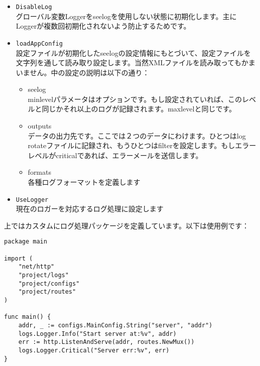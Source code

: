 \begin{itemize}
  \item \texttt{DisableLog}\\ グローバル変数Loggerをseelogを使用しない状態に初期化します。主にLoggerが複数回初期化されないよう防止するためです。
  \item \texttt{loadAppConfig}\\ 設定ファイルが初期化したseelogの設定情報にもとづいて、設定ファイルを文字列を通して読み取り設定します。当然XMLファイルを読み取ってもかまいません。中の設定の説明は以下の通り：
\begin{itemize}
  \item seelog\\ minlevelパラメータはオプションです。もし設定されていれば、このレベルと同じかそれ以上のログが記録されます。maxlevelと同じです。
  \item outputs\\ データの出力先です。ここでは２つのデータにわけます。ひとつはlog rotateファイルに記録され、もうひとつはfilterを設定します。もしエラーレベルがcriticalであれば、エラーメールを送信します。
  \item formats\\ 各種ログフォーマットを定義します
\end{itemize}
  \item \texttt{UseLogger}\\ 現在のロガーを対応するログ処理に設定します
\end{itemize}

上ではカスタムにログ処理パッケージを定義しています。以下は使用例です：

\begin{lstlisting}[numbers=none]
package main

import (
    "net/http"
    "project/logs"
    "project/configs"
    "project/routes"
)

func main() {
    addr, _ := configs.MainConfig.String("server", "addr")
    logs.Logger.Info("Start server at:%v", addr)
    err := http.ListenAndServe(addr, routes.NewMux())
    logs.Logger.Critical("Server err:%v", err)
}
\end{lstlisting}
